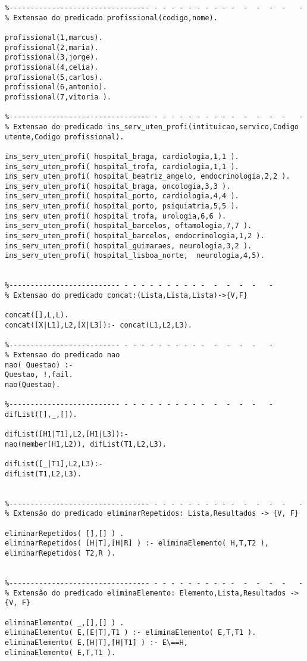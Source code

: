 \documentclass[pdftex,12pt,a4paper]{report}
\begin{document}
\begin{appendices}
\begin{Verbatim}
%--------------------------------- - - - - - - - - - -  -  -  -  -   -
% Extensao do predicado profissional(codigo,nome).

profissional(1,marcus).
profissional(2,maria).
profissional(3,jorge).
profissional(4,celia).
profissional(5,carlos).
profissional(6,antonio).
profissional(7,vitoria ).

%--------------------------------- - - - - - - - - - -  -  -  -  -   -
% Extensao do predicado ins_serv_uten_profi(intituicao,servico,Codigo utente,Codigo profissional).

ins_serv_uten_profi( hospital_braga, cardiologia,1,1 ).
ins_serv_uten_profi( hospital_trofa, cardiologia,1,1 ).
ins_serv_uten_profi( hospital_beatriz_angelo, endocrinologia,2,2 ).
ins_serv_uten_profi( hospital_braga, oncologia,3,3 ).
ins_serv_uten_profi( hospital_porto, cardiologia,4,4 ).
ins_serv_uten_profi( hospital_porto, psiquiatria,5,5 ).
ins_serv_uten_profi( hospital_trofa, urologia,6,6 ).
ins_serv_uten_profi( hospital_barcelos, oftamologia,7,7 ).
ins_serv_uten_profi( hospital_barcelos, endocrinologia,1,2 ).
ins_serv_uten_profi( hospital_guimaraes, neurologia,3,2 ).
ins_serv_uten_profi( hospital_lisboa_norte,  neurologia,4,5).


%-------------------------- - - - - - - - - - -  -  -  -  -   -
% Extensao do predicado concat:(Lista,Lista,Lista)->{V,F}

concat([],L,L).
concat([X|L1],L2,[X|L3]):- concat(L1,L2,L3).

%-------------------------- - - - - - - - - - -  -  -  -  -   -
% Extensao do predicado nao
nao( Questao) :-
Questao, !,fail.
nao(Questao).

%-------------------------- - - - - - - - - - -  -  -  -  -   -
difList([],_,[]).

difList([H1|T1],L2,[H1|L3]):-
nao(member(H1,L2)), difList(T1,L2,L3).

difList([_|T1],L2,L3):-
difList(T1,L2,L3).


%--------------------------------- - - - - - - - - - -  -  -  -  -   -
% Extensão do predicado eliminarRepetidos: Lista,Resultados -> {V, F}

eliminarRepetidos( [],[] ) .
eliminarRepetidos( [H|T],[H|R] ) :- eliminaElemento( H,T,T2 ),
eliminarRepetidos( T2,R ).


%--------------------------------- - - - - - - - - - -  -  -  -  -   -
% Extensão do predicado eliminaElemento: Elemento,Lista,Resultados -> {V, F}

eliminaElemento( _,[],[] ) .
eliminaElemento( E,[E|T],T1 ) :- eliminaElemento( E,T,T1 ).
eliminaElemento( E,[H|T],[H|T1] ) :- E\==H,
eliminaElemento( E,T,T1 ).


\end{Verbatim}
\end{appendices}
\end{document}
